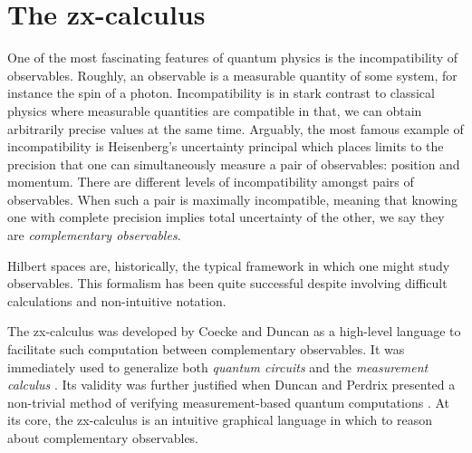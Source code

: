 %
%

\section{The zx-calculus}
\label{sec:ZxCalc}


One of the most fascinating features 
of quantum physics is the 
incompatibility of observables. 
Roughly, an observable is a 
measurable quantity of some system, 
for instance the spin of a photon.  
Incompatibility is in stark contrast 
to classical physics where
measurable quantities are compatible
in that, we can obtain
arbitrarily precise values 
at the same time.   
Arguably, the most famous example 
of incompatibility is 
Heisenberg's uncertainty principal
which places limits to 
the precision that one 
can simultaneously measure a 
pair of observables: 
position and momentum.  
There are different levels of 
incompatibility amongst 
pairs of observables. 
When such a pair is 
maximally incompatible, 
meaning that 
knowing one with complete precision 
implies total uncertainty of the other, 
we say they are 
\emph{complementary observables}.  

Hilbert spaces are, historically, 
the typical framework 
in which one might 
study observables.  
This formalism has been
quite successful
despite involving difficult calculations
and non-intuitive notation. 

The zx-calculus was 
developed by Coecke and Duncan 
	\cite{CoeckeDuncan_QuantumObsFullPaper} 
as a high-level language 
to facilitate such computation
between complementary observables.  
It was immediately used to 
generalize both \emph{quantum circuits}
	\cite{NielsenChuang_QuantumCompInfo}  
and the \emph{measurement calculus}
	\cite{DanosKashefiPanang_MeasurementCalc}. 
Its validity was further justified 
when Duncan and Perdrix 
presented a non-trivial method 
of verifying measurement-based 
quantum computations
	\cite{DuncanPerdrix_RewritingQuantumCompu}.  
At its core, the zx-calculus is 
an intuitive graphical language 
in which to reason about 
complementary observables. 

